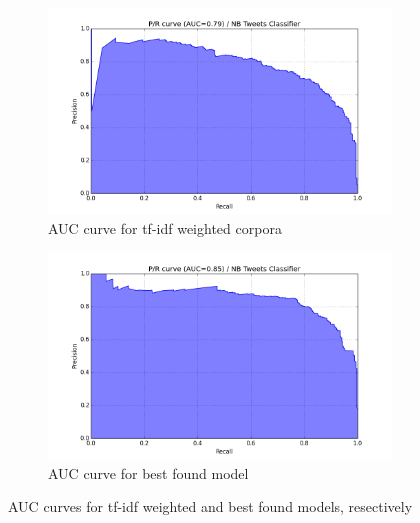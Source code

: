 \begin{figure}
  \centering
  \begin{subfigure}[b]{0.49\linewidth}
    \includegraphics[width=\linewidth]{figures/pr_NB_Tweets_Classifier_03}
  \caption{AUC curve for tf-idf weighted corpora}
  \label{fig:auc_tfidf}
  \end{subfigure}
  \begin{subfigure}[b]{0.49\linewidth}
    \includegraphics[width=\linewidth]{figures/pr_NB_Tweets_Classifier_04}
  \caption{AUC curve for best found model}
  \label{fig:auc_best_model}
  \end{subfigure}

  \caption{AUC curves for tf-idf weighted and best found models, resectively}
  \label{fig:auc_curves_tfidf_grid}
\end{figure}


